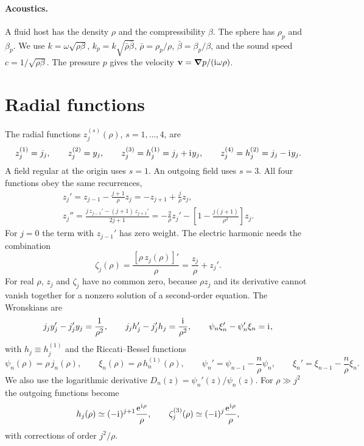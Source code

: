 \documentclass[
    pra,
    aps,
    reprint,
    onecolumn,
    amsmath,amssymb,
    a4paper,
    superscriptaddress,
    10pt,
    nofootinbib
]{revtex4-2}
\newcommand{\iu}{\mathrm{i}\mkern1mu}                 %
\newcommand{\eu}{\mathrm{e}\mkern1mu}                 %
\newcommand{\jj}{j(j+1)}
\newcommand{\rb}{\bar{\rho}}
\newcommand{\bb}{\bar{\beta}}
\begin{document}
\paragraph{Acoustics.}
A fluid host has the density $\rho$ and the compressibility $\beta$.
The sphere has $\rho_p$ and $\beta_p$.
We use $k = \omega\sqrt{\rho\beta}$, $k_p = k\sqrt{\rb\bb}$, $\rb = \rho_p/\rho$, $\bb = \beta_p/\beta$, and the sound speed $c = 1/\sqrt{\rho\beta}$.
The pressure $p$ gives the velocity $\vb{v} = \grad p/(\iu\omega\rho)$.

\section{Radial functions}
\label{sec:radial}

The radial functions $z_j^{(s)}(\rho)$, $s = 1, \dots, 4$, are
\begin{equation}
    z_j^{(1)} = j_j, \qquad
    z_j^{(2)} = y_j, \qquad
    z_j^{(3)} = h^{(1)}_j = j_j + \iu y_j, \qquad
    z_j^{(4)} = h^{(2)}_j = j_j - \iu y_j .
    \label{eq:zj}
\end{equation}
A field regular at the origin uses $s = 1$.
An outgoing field uses $s = 3$.
All four functions obey the same recurrences,
\begin{gather}
    z_j' = z_{j-1} - \frac{j+1}{\rho} z_j = -z_{j+1} + \frac{j}{\rho} z_j,
    \label{eq:zprime}
    \\
    z_j'' = \frac{j\, z_{j-1}' - (j+1)\, z_{j+1}'}{2j+1} = -\frac{2}{\rho} z_j' - \left[ 1 - \frac{\jj}{\rho^2} \right] z_j .
    \label{eq:zpp}
\end{gather}
For $j = 0$ the term with $z_{j-1}'$ has zero weight.
The electric harmonic needs the combination
\begin{equation}
    \zeta_j(\rho) = \frac{[\rho\, z_j(\rho)]'}{\rho} = \frac{z_j}{\rho} + z_j' .
    \label{eq:zeta}
\end{equation}
For real $\rho$, $z_j$ and $\zeta_j$ have no common zero, because $\rho z_j$ and its derivative cannot vanish together for a nonzero solution of a second-order equation.
The Wronskians are
\begin{equation}
    j_j y_j' - j_j' y_j = \frac{1}{\rho^2}, \qquad
    j_j h_j' - j_j' h_j = \frac{\iu}{\rho^2}, \qquad
    \psi_n \xi_n' - \psi_n' \xi_n = \iu,
    \label{eq:wronskian}
\end{equation}
with $h_j \equiv h_j^{(1)}$ and the Riccati--Bessel functions
\begin{equation}
    \psi_n(\rho) = \rho\, j_n(\rho), \qquad
    \xi_n(\rho) = \rho\, h^{(1)}_n(\rho), \qquad
    \psi_n' = \psi_{n-1} - \frac{n}{\rho}\psi_n, \qquad
    \xi_n' = \xi_{n-1} - \frac{n}{\rho}\xi_n .
    \label{eq:riccati}
\end{equation}
We also use the logarithmic derivative $D_n(z) = \psi_n'(z)/\psi_n(z)$.
For $\rho \gg j^2$ the outgoing functions become
\begin{equation}
    h_j(\rho) \simeq (-\iu)^{j+1} \frac{\eu^{\iu\rho}}{\rho}, \qquad
    \zeta_j^{(3)}(\rho) \simeq (-\iu)^{j} \frac{\eu^{\iu\rho}}{\rho},
    \label{eq:hankel_far}
\end{equation}
with corrections of order $j^2/\rho$.
\end{document}

